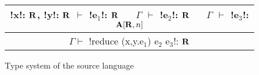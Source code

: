 \begin{figure*}[tb]
    \begin{tabular}{c}
        !x!: $\mathbf{R}$, !y!: $\mathbf{R}$ $\vdash$ !e$_1$!: $\mathbf{R}$ 
        $\quad$ $\Gamma$ $\vdash$ !e$_2$!: $\mathbf{R}$
        $\quad$ $\Gamma$ $\vdash$ !e$_3$!: $\mathbf{A}[\mathbf{R},n]$
        \\\hline  
        $\Gamma \vdash$ !reduce (x,y.e$_1$) e$_2$ e$_3$!: $\mathbf{R}$
    \end{tabular}
    \vspace{-0.2cm}
    \caption{Type system of the source language}
    \vspace{-0.4cm}
    \label{fig:source_typesystem}
    \end{figure*}